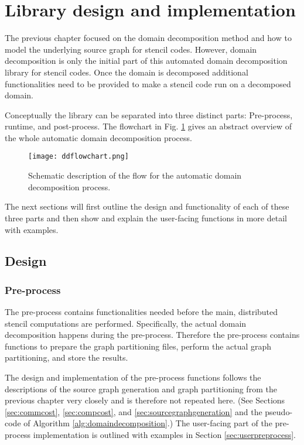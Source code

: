 \section{Library design and implementation}
The previous chapter focused on the domain decomposition method and how to model the underlying source graph for stencil codes.
However, domain decomposition is only the initial part of this automated domain decomposition library for stencil codes.
Once the domain is decomposed additional functionalities need to be provided to make a stencil code run on a decomposed domain.

Conceptually the library can be separated into three distinct parts:
Pre-process, runtime, and post-process.
The flowchart in Fig. \ref{fig:library_flowchart} gives an abstract overview of the whole automatic domain decomposition process.

\begin{figure}
\centering
\texttt{[image: ddflowchart.png]}
\caption{Schematic description of the flow for the automatic domain decomposition process.}
\label{fig:library_flowchart}
\end{figure}

The next sections will first outline the design and functionality of each of these three parts and then show and explain the user-facing functions in more detail with examples.

\subsection{Design}


\subsubsection{Pre-process}
The pre-process contains functionalities needed before the main, distributed stencil computations are performed.
Specifically, the actual domain decomposition happens during the pre-process.
Therefore the pre-process contains functions to prepare the graph partitioning files, perform the actual graph partitioning, and store the results.

The design and implementation of the pre-process functions follows the descriptions of the source graph generation and graph partitioning from the previous chapter very closely and is therefore not repeated here. (See Sections \ref{sec:commcost}, \ref{sec:compcost}, and \ref{sec:sourcegraphgeneration} and the pseudo-code of Algorithm \ref{alg:domaindecomposition}.)
The user-facing part of the pre-process implementation is outlined with examples in Section \ref{sec:userpreprocess}.

